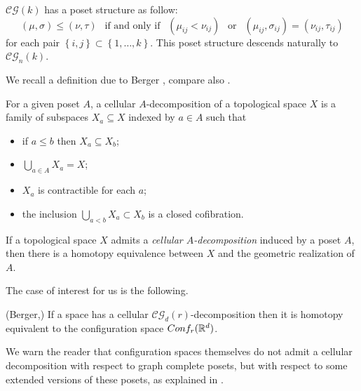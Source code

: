 \begin{definition}
	$\mathcal{CG}(k)$ has a poset structure as follow:
	\begin{equation*}
		(\mu,\sigma)\le (\nu,\tau) \ \ \text{ if and only if } \ \ (\mu_{ij}<\nu_{ij}) \ \ \text{ or } \ \ (\mu_{ij},\sigma_{ij})= (\nu_{ij},\tau_{ij})
	\end{equation*}
	for each pair $\left\lbrace i,j\right\rbrace \subset\left\lbrace 1,\dots,k  \right\rbrace $. This poset structure descends naturally to $\mathcal{CG}_{n}(k)$.
\end{definition}
We recall a definition due to Berger \cite{berger1997confspacemodel}, compare also \cite{beuckelmann2021master}.
\begin{definition}
For a given poset $A$, a cellular $A$-decomposition of a topological space $X$ is a family of subspaces $X_a \subseteq X$ indexed by $a \in A$ such that
\begin{itemize}
    \item if $a \leq b$ then $X_a \subseteq X_b$;
\item $\bigcup_{a \in A} X_a = X$;
\item $X_a$ is contractible for each $a$;
\item the inclusion $\bigcup_{a<b} X_a \subset X_b$ is a closed cofibration.
\end{itemize}
\end{definition} 

\begin{proposition}
If a topological space $X$ admits a \textit{cellular $A$-decomposition} induced by a poset $A$, then there is a homotopy equivalence between $X$ and the geometric realization of $A$. 
\end{proposition}

The case of interest for us is the following.

\begin{theorem} (Berger,\cite[\S1.13]{berger1997confspacemodel})
If a space has a cellular $\mathcal{CG}_d(r)$-decomposition then it is homotopy equivalent to 
the configuration space 
$Conf_{r}(\mathbb{R}^{d})$.
\end{theorem}

We warn the reader that configuration spaces themselves do not admit a cellular decomposition with respect to graph complete posets, but with respect to some extended versions of these posets, as explained in \cite{beuckelmann2021master}.




